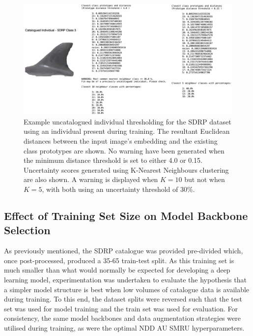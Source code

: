 \begin{figure}
	\begin{center}
		\includegraphics[scale=0.5]{Chapter6/figs/catalogued-individual-thresholding.png}
	\end{center}
	\caption{Example uncatalogued individual thresholding for the SDRP dataset using an individual present during training. The resultant Euclidean distances between the input image's embedding and the existing class prototypes are shown. No warning have been generated when the minimum distance threshold is set to either 4.0 or 0.15. Uncertainty scores generated using K-Nearest Neighbours clustering are also shown. A warning is displayed when $K = 10$ but not when $K = 5$, with both using an uncertainty threshold of 30\%.}
	\label{fig:catalogued-individual-example-sdrp}
\end{figure}









\subsection{Effect of Training Set Size on Model Backbone Selection}\label{ch:SNNGeneralisation,sec:SNNEvalWithSDRP,sec:reversedSDRP}

 As previously mentioned, the SDRP catalogue was provided pre-divided which, once post-processed, produced a 35-65 train-test split. As this training set is much smaller than what would normally be expected for developing a deep learning model, experimentation was undertaken to evaluate the hypothesis that a simpler model structure is best when low volumes of catalogue data is available during training. To this end, the dataset splits were reversed such that the test set was used for model training and the train set was used for evaluation. For consistency, the same model backbones and data augmentation strategies were utilised during training, as were the optimal NDD AU SMRU hyperparameters. 

